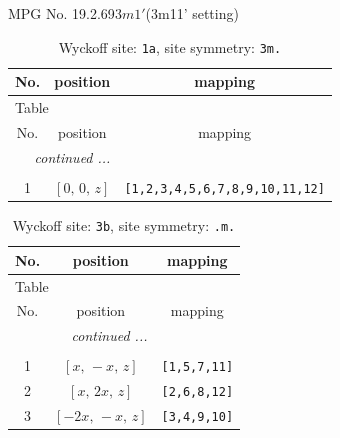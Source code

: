 \documentclass[fleqn,8pt]{jsarticle}
\begin{document}
\setcounter{MaxMatrixCols}{32}

\renewcommand{\tablename}{Table~}
\renewcommand{\figurename}{Figure~}
\begin{center}
\LARGE
MPG No. 19.2.69\quad$3m1'$\quad(3m11' setting)
\end{center}
\renewcommand{\arraystretch}{1.2}
\begin{longtable}{ccc}
\caption{Wyckoff site: {\tt 1a}, site symmetry: {\tt 3m.}}
 \\
 \hline \hline
No. & position & mapping \\ \hline \endfirsthead

\multicolumn{2}{l}{\tablename\ \thetable{}} \\
 \hline \hline
No. & position & mapping \\ \hline \endhead

 \hline \hline
\multicolumn{2}{r}{\footnotesize\it continued ...} \\ \endfoot

 \hline \hline
\multicolumn{2}{r}{} \\ \endlastfoot

1 & $\left[ 0,\, 0,\, z \right]$ & {\tt [1,2,3,4,5,6,7,8,9,10,11,12]} \\
\end{longtable}
\renewcommand{\arraystretch}{1.2}
\begin{longtable}{ccc}
\caption{Wyckoff site: {\tt 3b}, site symmetry: {\tt .m.}}
 \\
 \hline \hline
No. & position & mapping \\ \hline \endfirsthead

\multicolumn{2}{l}{\tablename\ \thetable{}} \\
 \hline \hline
No. & position & mapping \\ \hline \endhead

 \hline \hline
\multicolumn{2}{r}{\footnotesize\it continued ...} \\ \endfoot

 \hline \hline
\multicolumn{2}{r}{} \\ \endlastfoot

1 & $\left[ x,\, - x,\, z \right]$ & {\tt [1,5,7,11]} \\ \hline
2 & $\left[ x,\, 2 x,\, z \right]$ & {\tt [2,6,8,12]} \\ \hline
3 & $\left[ - 2 x,\, - x,\, z \right]$ & {\tt [3,4,9,10]} \\
\end{longtable}
\renewcommand{\arraystretch}{1.2}
\end{document}
